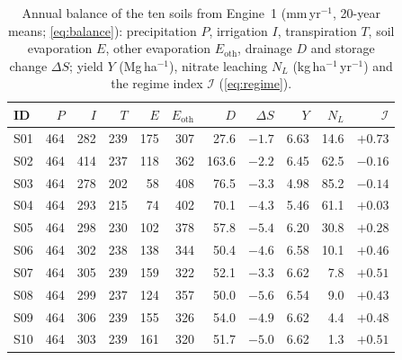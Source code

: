 \documentclass[preprint,12pt]{elsarticle}
\begin{document}
\begin{table}[H]\centering\small
\caption{Annual balance of the ten soils from Engine~1 (mm\,yr$^{-1}$, 20-year means; \cref{eq:balance}): precipitation $P$, irrigation $I$, transpiration $T$, soil evaporation $E$, other evaporation $E_{\mathrm{oth}}$, drainage $D$ and storage change $\Delta S$; yield $Y$ (Mg\,ha$^{-1}$), nitrate leaching $N_L$ (kg\,ha$^{-1}$\,yr$^{-1}$) and the regime index $\mathcal I$ (\cref{eq:regime}).}
\label{tab:swa-bal}
\begin{tabular}{lrrrrrrrrrr}
\toprule
ID & $P$ & $I$ & $T$ & $E$ & $E_{\mathrm{oth}}$ & $D$ & $\Delta S$ & $Y$ & $N_L$ & $\mathcal I$\\\midrule
S01 & 464 & 282 & 239 & 175 & 307 & 27.6 & $-1.7$ & 6.63 & 14.6 & $+0.73$\\
S02 & 464 & 414 & 237 & 118 & 362 & 163.6 & $-2.2$ & 6.45 & 62.5 & $-0.16$\\
S03 & 464 & 278 & 202 & 58 & 408 & 76.5 & $-3.3$ & 4.98 & 85.2 & $-0.14$\\
S04 & 464 & 293 & 215 & 74 & 402 & 70.1 & $-4.3$ & 5.46 & 61.1 & $+0.03$\\
S05 & 464 & 298 & 230 & 102 & 378 & 57.8 & $-5.4$ & 6.20 & 30.8 & $+0.28$\\
S06 & 464 & 302 & 238 & 138 & 344 & 50.4 & $-4.6$ & 6.58 & 10.1 & $+0.46$\\
S07 & 464 & 305 & 239 & 159 & 322 & 52.1 & $-3.3$ & 6.62 & 7.8 & $+0.51$\\
S08 & 464 & 299 & 237 & 124 & 357 & 50.0 & $-5.6$ & 6.54 & 9.0 & $+0.43$\\
S09 & 464 & 306 & 239 & 155 & 326 & 54.0 & $-4.9$ & 6.62 & 4.4 & $+0.48$\\
S10 & 464 & 303 & 239 & 161 & 320 & 51.7 & $-5.0$ & 6.62 & 1.3 & $+0.51$\\\bottomrule
\end{tabular}
\end{table}
\end{document}

